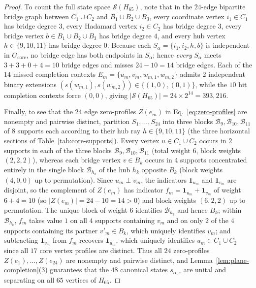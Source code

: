 \documentclass[
  aps,
  pra,
  reprint,
  superscriptaddress,
  amsmath,
  amssymb,
  nofootinbib,
  floatfix
]{revtex4-2}
\theoremstyle{definition}
\theoremstyle{remark}
\begin{document}
\begin{proof}
To count the full state space $\mathcal{S}(H_{65})$, note that in the $24$-edge bipartite bridge graph between $C_1\cup C_2$ and $B_1\cup B_2\cup B_3$, every coordinate vertex $i_1\in C_1$ has bridge degree $3$, every Hadamard vertex $i_2\in C_2$ has bridge degree $3$, every bridge vertex $b\in B_1\cup B_2\cup B_3$ has bridge degree $4$, and every hub vertex $h\in\{9,10,11\}$ has bridge degree $0$. Because each $S_\alpha=\{i_1,i_2,h,b\}$ is independent in $G_{\mathrm{core}}$, no bridge edge has both endpoints in $S_\alpha$; hence \emph{every} $S_\alpha$ meets $3+3+0+4=10$ bridge edges and misses $24-10=14$ bridge edges. Each of the $14$ missed completion contexts $E_m=\{u_m,v_m,w_{m,1},w_{m,2}\}$ admits $2$ independent binary extensions $(s(w_{m,1}),s(w_{m,2}))\in\{(1,0),(0,1)\}$, while the $10$ hit completion contexts force $(0,0)$, giving $|\mathcal{S}(H_{65})|=24\times 2^{14}=393{,}216$.

Finally, to see that the $24$ edge zero-profiles $Z(e_m)$ in Eq.~\eqref{eq:zero-profiles} are nonempty and pairwise distinct, partition $S_1,\ldots,S_{24}$ into three blocks $\mathcal{B}_9,\mathcal{B}_{10},\mathcal{B}_{11}$ of $8$ supports each according to their hub ray $h\in\{9,10,11\}$ (the three horizontal sections of Table~\ref{tab:core-supports}). Every vertex $u\in C_1\cup C_2$ occurs in $2$ supports in each of the three blocks $\mathcal{B}_9,\mathcal{B}_{10},\mathcal{B}_{11}$ (total weight $6$, block weights $(2,2,2)$), whereas each bridge vertex $v\in B_k$ occurs in $4$ supports concentrated entirely in the single block $\mathcal{B}_{h_k}$ of the hub $h_k$ opposite $B_k$ (block weights $(4,0,0)$ up to permutation). Since $u_m\perp v_m$, the indicators $\mathbf{1}_{u_m}$ and $\mathbf{1}_{v_m}$ are disjoint, so the complement of $Z(e_m)$ has indicator $f_m=\mathbf{1}_{u_m}+\mathbf{1}_{v_m}$ of weight $6+4=10$ (so $|Z(e_m)|=24-10=14>0$) and block weights $(6,2,2)$ up to permutation. The unique block of weight $6$ identifies $\mathcal{B}_{h_k}$ and hence $B_k$; within $\mathcal{B}_{h_k}$, $f_m$ takes value $1$ on all $4$ supports containing $v_m$ and on only $2$ of the $4$ supports containing its partner $v'_m\in B_k$, which uniquely identifies $v_m$; and subtracting $\mathbf{1}_{v_m}$ from $f_m$ recovers $\mathbf{1}_{u_m}$, which uniquely identifies $u_m\in C_1\cup C_2$ since all $17$ core vertex profiles are distinct. Thus all $24$ zero-profiles $Z(e_1),\ldots,Z(e_{24})$ are nonempty and pairwise distinct, and Lemma~\ref{lem:plane-completion}(3) guarantees that the $48$ canonical states $s_{\alpha,\varepsilon}$ are unital and separating on all $65$ vertices of $H_{65}$.
\end{proof}
\end{document}

